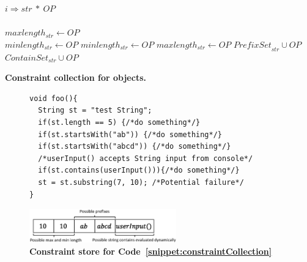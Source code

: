 \begin{algorithm}[t]
\scriptsize
\DontPrintSemicolon
{}
\Begin
{
  {
   $i \Rightarrow str\ *\ OP$ \\
    {\\
   \mytab $maxlength_{str} \longleftarrow OP$\\
   \mytab $minlength_{str} \longleftarrow OP$
   }  {
    $minlength_{str} \longleftarrow OP$
   }  {
    $maxlength_{str} \longleftarrow OP$
   }  {
    $\textit{PrefixSet}_{str} \cup OP$
   }  {
    $\textit{ContainSet}_{str} \cup OP$
   }
  }
}
\caption{\bf Constraint collection for  objects.}
\label{algo:constraintCollection}
\end{algorithm}


\lstset{language=Java, caption=Static and dynamic constraint
collection example, label = snippet:constraintCollection, firstnumber =1}
\begin{figure}[t]
\begin{lstlisting}
void foo(){
  String st = "test String";
  if(st.length == 5) {/*do something*/}
  if(st.startsWith("ab")) {/*do something*/}
  if(st.startsWith("abcd")) {/*do something*/}
  /*userInput() accepts String input from console*/
  if(st.contains(userInput())){/*do something*/}
  st = st.substring(7, 10); /*Potential failure*/
}
\end{lstlisting}
\end{figure}


\begin{figure}[t]
\centering
\includegraphics[width=2.5in]{images/ConstraintExample.eps}
\caption{\bf Constraint store for Code~\ref{snippet:constraintCollection}}
\label{fig:constraintExample}
\end{figure}

